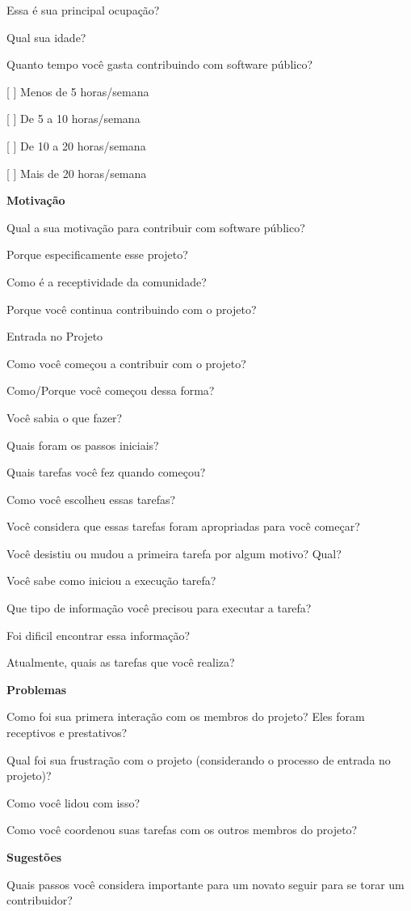 \begin{anexosenv}
Essa é sua principal ocupação?

Qual sua idade?

Quanto tempo você gasta contribuindo com software público?

[ ] Menos de 5 horas/semana 

[ ] De 5 a 10 horas/semana

[ ] De 10 a 20 horas/semana

[ ] Mais de 20 horas/semana


\textbf{Motivação}

Qual a sua motivação para contribuir com software público?

Porque especificamente esse projeto?

Como é a receptividade da comunidade?

Porque você continua contribuindo com o projeto?

Entrada no Projeto

Como você começou a contribuir com o projeto?

Como/Porque você começou dessa forma?

Você sabia o que fazer?

Quais foram os passos iniciais?

Quais tarefas você fez quando começou?

Como você escolheu essas tarefas?

Você considera que essas tarefas foram apropriadas para você começar? 

Você desistiu ou mudou a primeira tarefa por algum motivo? Qual?

Você sabe como iniciou a execução tarefa?

Que tipo de informação você precisou para executar a tarefa?

Foi dificil encontrar essa informação?

Atualmente, quais as tarefas que você realiza?


\textbf{Problemas}

Como foi sua primera interação com os membros do projeto? Eles foram receptivos e prestativos?

Qual foi sua frustração com o projeto (considerando o processo de entrada no projeto)?

Como você lidou com isso?

Como você coordenou suas tarefas com os outros membros do projeto?


\textbf{Sugestões}

Quais passos você considera importante para um novato seguir para se torar um contribuidor?


\end{anexosenv}
